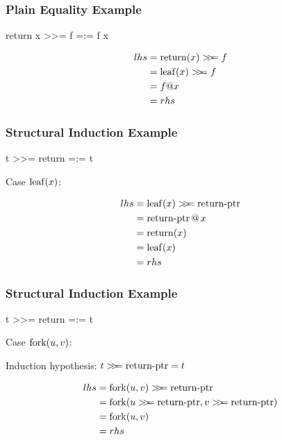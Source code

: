 \documentclass[serif,professionalfont]{beamer}
\begin{document}
\begin{frame}[fragile]
\frametitle{Plain Equality Example}

\begin{code}
return x >>= f =:= f x
\end{code}

\begin{align*}
lhs = & \; \bind{\return{x}}{f}        \\
    = & \; \bind{\leaf{x}}{f}          \\
    = & \; f @ x                       \\
    = & \; rhs
\end{align*}


\end{frame}

\begin{frame}[fragile]
\frametitle{Structural Induction Example}

\begin{code}
t >>= return =:= t
\end{code}

\vspace{2\baselineskip}

Case $\mathrm{leaf}(x)$:

\begin{align*}
lhs = & \; \mathrm{leaf}(x) >\!\!>\!\!= \mathrm{\operatorname{return-ptr}} \\
    = & \; \mathrm{\operatorname{return-ptr}} \, @ \, x         \\
    = & \; \mathrm{return}(x)                    \\
    = & \; \mathrm{leaf}(x)                      \\
    = & \; rhs
\end{align*}

\end{frame}

\begin{frame}[fragile]
\frametitle{Structural Induction Example}

\begin{code}
t >>= return =:= t
\end{code}

\vspace{2\baselineskip}

Case $\mathrm{fork}(u,v)$:

\vspace{1\baselineskip}

Induction hypothesis: $t >\!\!>\!\!= \mathrm{\operatorname{return-ptr}} = t$

\begin{align*}
lhs = & \; \bind{\fork{u}{v}}{\ptr{return}}                      \\
    = & \; \fork{\bind{u}{\ptr{return}}}{\bind{v}{\ptr{return}}} \\
    = & \; \fork{u}{v}                                           \\
    = & \; rhs
\end{align*}

\end{frame}
\end{document}
